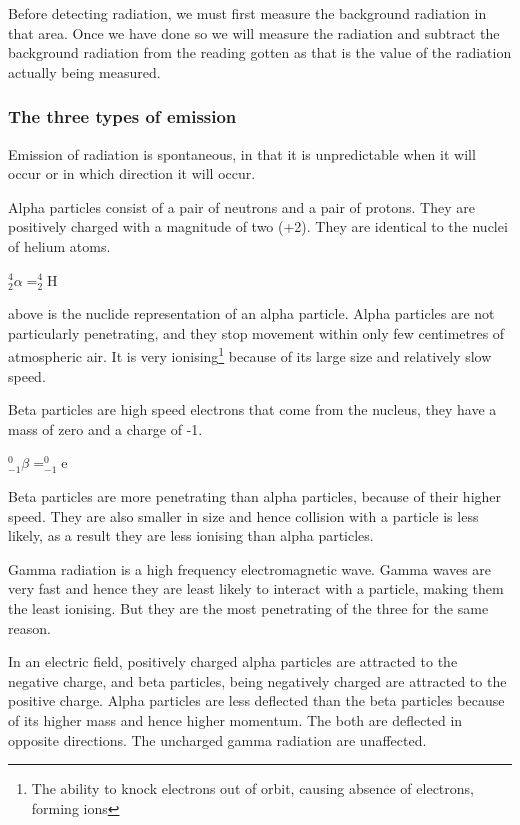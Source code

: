 Before detecting radiation, we must first measure the background radiation in that area. Once we
have done so we will measure the radiation and subtract the background radiation from the reading
gotten as that is the value of the radiation actually being measured.

\subsubsection{The three types of emission}
Emission of radiation is spontaneous, in that it is unpredictable when it will occur or in which
direction it will occur.

Alpha particles consist of a pair of neutrons and a pair of protons. They are positively charged
with a magnitude of two (+2). They are identical to the nuclei of helium atoms.
\begin{center}
	$^4_2\alpha = ^4_2$H
\end{center}
above is the nuclide representation of an alpha particle.
Alpha particles are not particularly penetrating, and they stop movement within only few 
centimetres of atmospheric air. It is very ionising\footnote{The ability to knock electrons out
of orbit, causing absence of electrons, forming ions} because of its large size and relatively slow
speed.

Beta particles are high speed electrons that come from the nucleus, they have a mass of zero and a
charge of -1.
\begin{center}
	$^0_{-1}\beta = ^0_{-1}$e
\end{center}
Beta particles are more penetrating than alpha particles, because of their higher speed. They are
also smaller in size and hence collision with a particle is less likely, as a result they are less
ionising than alpha particles.

Gamma radiation is a high frequency electromagnetic wave. Gamma waves are very fast and hence they
are least likely to interact with a particle, making them the least ionising. But they are the
most penetrating of the three for the same reason.

In an electric field, positively charged alpha particles are attracted to the negative charge,
and beta particles, being negatively charged are attracted to the positive charge. Alpha particles
are less deflected than the beta particles because of its higher mass and hence higher momentum. 
The both are
deflected in opposite directions. The uncharged gamma radiation are unaffected.

